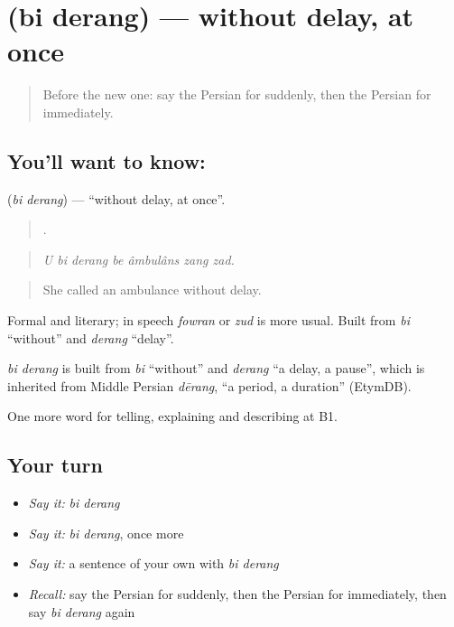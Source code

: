 \section[\texorpdfstring{\fa{بی} \fa{درنگ} (bi derang)}{بی درنگ (bi derang)}]{  (bi derang) — without delay, at once}

\label{lesson:FA-C300-bi-derang}



\begin{quote}
Before the new one: say the Persian for suddenly, then the Persian for immediately.
\end{quote}

\subsection*{You'll want to know:  }
\textbf{ } (\emph{bi derang}) — \textquotedblleft{}without delay, at once\textquotedblright{}.

\begin{quote}
      .
\end{quote}

\begin{quote}
\emph{U bi derang be âmbulâns zang zad.}
\end{quote}

\begin{quote}
She called an ambulance without delay.
\end{quote}

Formal and literary; in speech \emph{fowran} or \emph{zud} is more usual. Built from \emph{bi} \textquotedblleft{}without\textquotedblright{} and \emph{derang} \textquotedblleft{}delay\textquotedblright{}.

\begin{cousinweb}
\emph{bi derang} is built from \emph{bi} \textquotedblleft{}without\textquotedblright{} and \emph{derang} \textquotedblleft{}a delay, a pause\textquotedblright{}, which is inherited from Middle Persian \emph{dērang}, \textquotedblleft{}a period, a duration\textquotedblright{} (EtymDB).
\end{cousinweb}

\begin{grammarlens}[title={What you've built}]
One more word for telling, explaining and describing at B1.
\end{grammarlens}

\subsection*{Your turn}
\begin{itemize}
\raggedright
  \item \emph{Say it:} \emph{bi derang}
  \item \emph{Say it:} \emph{bi derang}, once more
  \item \emph{Say it:} a sentence of your own with \emph{bi derang}
  \item \emph{Recall:} say the Persian for suddenly, then the Persian for immediately, then say \emph{bi derang} again
\end{itemize}

